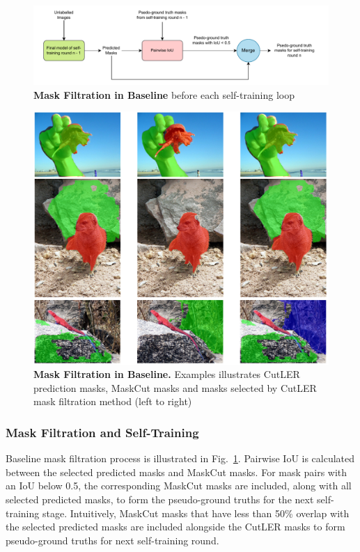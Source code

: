 \begin{figure}
	\centering
	\includegraphics[width=1\textwidth]{Images/main/baseline_mask_filtration.pdf}
	\caption[\textbf{Mask Filtration in Baseline}]{\textbf{Mask Filtration in Baseline} before each self-training loop}
	\label{fig:baseline_mask_filtration}
\end{figure}

\begin{figure}
	\centering
	\includegraphics[width=1\textwidth]{Images/main/filtered_mask_problem.png}
	\caption[\textbf{Mask Filtration in Baseline}]{\textbf{Mask Filtration in Baseline.} Examples illustrates CutLER prediction masks, MaskCut masks and masks selected by CutLER mask filtration method (left to right)}
	\label{fig:filtered_mask_problem}
\end{figure}

\subsubsection{Mask Filtration and Self-Training}
Baseline mask filtration process is illustrated in Fig.~\ref{fig:baseline_mask_filtration}.  Pairwise IoU is calculated between the selected predicted masks and MaskCut masks. For mask pairs with an IoU below 0.5, the corresponding MaskCut masks are included, along with all selected predicted masks, to form the pseudo-ground truths for the next self-training stage. Intuitively, MaskCut masks that have less than 50\% overlap with the selected predicted masks are included alongside the CutLER masks to form pseudo-ground truths for next self-training round. 

